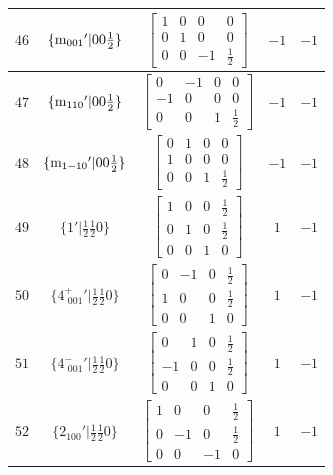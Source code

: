 \documentclass[fleqn,8pt]{jsarticle}
\begin{document}
\begin{longtable}{ccccc}
$ 46 $ & $ \{{\rm m}_{001}{}'|0 0 \frac{1}{2}\} $ & $ \begin{bmatrix} 1 & 0 & 0 & 0 \\ 0 & 1 & 0 & 0 \\ 0 & 0 & -1 & \frac{1}{2} \end{bmatrix} $ & $ -1 $ & $ -1 $ \\ \hline
$ 47 $ & $ \{{\rm m}_{110}{}'|0 0 \frac{1}{2}\} $ & $ \begin{bmatrix} 0 & -1 & 0 & 0 \\ -1 & 0 & 0 & 0 \\ 0 & 0 & 1 & \frac{1}{2} \end{bmatrix} $ & $ -1 $ & $ -1 $ \\ \hline
$ 48 $ & $ \{{\rm m}_{1-10}{}'|0 0 \frac{1}{2}\} $ & $ \begin{bmatrix} 0 & 1 & 0 & 0 \\ 1 & 0 & 0 & 0 \\ 0 & 0 & 1 & \frac{1}{2} \end{bmatrix} $ & $ -1 $ & $ -1 $ \\ \hline
$ 49 $ & $ \{1{}'|\frac{1}{2} \frac{1}{2} 0\} $ & $ \begin{bmatrix} 1 & 0 & 0 & \frac{1}{2} \\ 0 & 1 & 0 & \frac{1}{2} \\ 0 & 0 & 1 & 0 \end{bmatrix} $ & $ 1 $ & $ -1 $ \\ \hline
$ 50 $ & $ \{4^{+}_{\,\,001}{}'|\frac{1}{2} \frac{1}{2} 0\} $ & $ \begin{bmatrix} 0 & -1 & 0 & \frac{1}{2} \\ 1 & 0 & 0 & \frac{1}{2} \\ 0 & 0 & 1 & 0 \end{bmatrix} $ & $ 1 $ & $ -1 $ \\ \hline
$ 51 $ & $ \{4^{-}_{\,\,001}{}'|\frac{1}{2} \frac{1}{2} 0\} $ & $ \begin{bmatrix} 0 & 1 & 0 & \frac{1}{2} \\ -1 & 0 & 0 & \frac{1}{2} \\ 0 & 0 & 1 & 0 \end{bmatrix} $ & $ 1 $ & $ -1 $ \\ \hline
$ 52 $ & $ \{2{}_{100}{}'|\frac{1}{2} \frac{1}{2} 0\} $ & $ \begin{bmatrix} 1 & 0 & 0 & \frac{1}{2} \\ 0 & -1 & 0 & \frac{1}{2} \\ 0 & 0 & -1 & 0 \end{bmatrix} $ & $ 1 $ & $ -1 $ \\ \hline

\end{longtable}
\end{document}
